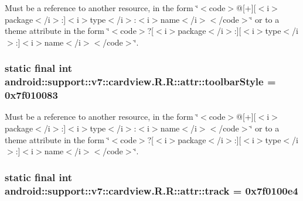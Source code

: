 Must be a reference to another resource, in the form \char`\"{}$<$code$>$@\mbox{[}+\mbox{]}\mbox{[}$<$i$>$package$<$/i$>$:\mbox{]}$<$i$>$type$<$/i$>$:$<$i$>$name$<$/i$>$$<$/code$>$\char`\"{} or to a theme attribute in the form \char`\"{}$<$code$>$?\mbox{[}$<$i$>$package$<$/i$>$:\mbox{]}\mbox{[}$<$i$>$type$<$/i$>$:\mbox{]}$<$i$>$name$<$/i$>$$<$/code$>$\char`\"{}. \hypertarget{classandroid_1_1support_1_1v7_1_1cardview_1_1_r_1_1attr_d7a4aa77dc5a5a71d69ac8ba5bd5296b}{
\subsubsection[{toolbarStyle}]{\setlength{\rightskip}{0pt plus 5cm}static final int android::support::v7::cardview.R.R::attr::toolbarStyle = 0x7f010083}}
\label{classandroid_1_1support_1_1v7_1_1cardview_1_1_r_1_1attr_d7a4aa77dc5a5a71d69ac8ba5bd5296b}


Must be a reference to another resource, in the form \char`\"{}$<$code$>$@\mbox{[}+\mbox{]}\mbox{[}$<$i$>$package$<$/i$>$:\mbox{]}$<$i$>$type$<$/i$>$:$<$i$>$name$<$/i$>$$<$/code$>$\char`\"{} or to a theme attribute in the form \char`\"{}$<$code$>$?\mbox{[}$<$i$>$package$<$/i$>$:\mbox{]}\mbox{[}$<$i$>$type$<$/i$>$:\mbox{]}$<$i$>$name$<$/i$>$$<$/code$>$\char`\"{}. \hypertarget{classandroid_1_1support_1_1v7_1_1cardview_1_1_r_1_1attr_b3a8acb801a8ff1f358d66954b86c68d}{
\subsubsection[{track}]{\setlength{\rightskip}{0pt plus 5cm}static final int android::support::v7::cardview.R.R::attr::track = 0x7f0100e4}}
\label{classandroid_1_1support_1_1v7_1_1cardview_1_1_r_1_1attr_b3a8acb801a8ff1f358d66954b86c68d}


